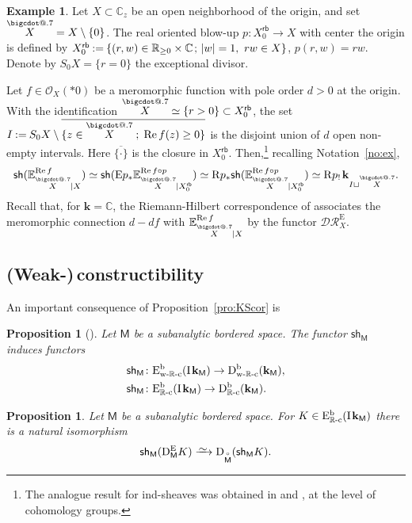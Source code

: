 \documentclass[11pt]{article}
\makeatletter
\numberwithin{equation}{section}
\let\mathcal\mathscr
\newcommand{\isom}{\xrightarrow{{\raisebox{-.6ex}[0ex][0ex]{$\mspace{1mu}\textstyle\sim\mspace{2mu}$}}}}
\newcommand{\accentset}[2]{\overset{#1}{#2}}
\let\ol\overline
\newcommand*\bigcdot{\mathpalette\bigcdot@{.7}}
\newcommand*\bigcdot@[2]{\mathbin{\vcenter{\hbox{\scalebox{#2}{$\m@th#1\bullet$}}}}}
\newcommand{\bdot}[1]{{\accentset{\bigcdot}{#1}}\vphantom{#1}}
\newcommand{\semicolon}{\nobreak \mskip2mu\mathpunct{}\nonscript\mkern-\thinmuskip{;}\mskip6mu plus1mu\relax}
\theoremstyle{plain}
\newtheorem{proposition}[theorem]{Proposition}
\theoremstyle{definition}
\newtheorem{example}[theorem]{Example}
\newcommand{\C}{\mathbb{C}}
\newcommand{\R}{\mathbb{R}}
\renewcommand{\Re}{\operatorname{Re}}
\newcommand{\derived}[1]{\mathrm{#1}}
\newcommand{\derd}{\derived{D}}
\newcommand{\dere}{\derived{E}}\let\enh\dere
\newcommand{\derr}{\derived{R}}
\newcommand{\BDC}{\derd^{\mathrm{b}}}
\newcommand{\BECRc}[2][\ifield]{\dere^{\mathrm{b}}_\Rc(#1_{#2})}
\newcommand{\BECwRc}[2][\ifield]{\dere^{\mathrm{b}}_\wRc(#1_{#2})}
\newcommand{\roim}[1]{\derr#1_*}
\newcommand{\reim}[1]{\derr#1_{\mspace{.5mu}!}\mspace{2mu}}
\newcommand{\drE}[1][X]{\mathcal{DR}^\enh_{#1}}
\newcommand{\sheaffont}[1]{\mathcal{#1}}
\renewcommand{\O}{\sheaffont{O}}
\newcommand{\Edual}{\dual^\enh}
\newcommand{\Eoim}[1]{\enh#1_*}
\newcommand{\dual}{\mathrm{D}}
\newcommand{\Rc}{{\R\text-\mathrm{c}}}
\newcommand{\wRc}{{\mathrm{w}\text-\R\text-\mathrm{c}}}
\newcommand{\field}{\mathbf{k}}\let\cor\field
\newcommand{\ind}{\mathrm{I}\mspace{2mu}}
\newcommand{\ifield}{\ind\field}
\newcommand{\unbordered}[1]{{\accentset{\circ}{#1}}}
\newcommand{\rb}{\mathsf{rb}}
\newcommand{\sh}{\mathsf{sh}}
\newcommand{\bbM}{\mathsf{M}}
\newcommand{\obM}{\unbordered{\bbM}}
\newcommand{\Ex}{\mathbb{E}}
\newcommand{\RB}[2][N]{#2_{#1}^{\rb}}
\newcommand{\defeq}{\mathbin{:=}}\let \seteq\defeq
\newcommand{\st}[1]{{\{{#1}\}}}
\makeatother
\begin{document}
\begin{example}
Let $X\subset \C_z$ be an open neighborhood of the origin, and set $\bdot X=X\setminus\st0$.
The real oriented blow-up $p\colon \RB[0]X \to X$ with center the origin is
defined by $\RB[0]X \defeq\st{(r,w)\in\R_{\ge0}\times\C\semicolon |w|=1,\ rw\in X}$,
$p(r,w)=r w$. Denote by $S_0X=\st{r=0}$ the exceptional divisor.

Let $f\in\O_X(*0)$ be a meromorphic function with pole order $d>0$
at the origin.
With the identification $\bdot X\simeq\st{r>0}\subset\RB[0]X$, the set
$I\seteq S_0X\setminus\ol{\st{z\in\bdot X\;;\;\Re f(z)\ge0}}$
is the disjoint union of $d$ open non-empty intervals.
Here
$\ol{\st{\cdot}}$ is the closure in $\RB[0]X$.
Then,\footnote{The analogue result for ind-sheaves was obtained in \cite[Prop.\,7.3]{KS03} and \cite[Prop.\,3.14]{IT20}, at the level of cohomology groups.} recalling Notation~\ref{no:ex},
\[
\sh(\Ex_{\bdot X|X}^{\Re f}) \simeq
\sh (\Eoim p \Ex_{\bdot X|\RB[0]X}^{\Re f\circ p})
\simeq \roim p\sh ( \Ex_{\bdot X|\RB[0]X}^{\Re f\circ p})\simeq
\reim p \field_{I\sqcup\bdot X}.
\]
Recall that, for $\field=\C$, the Riemann-Hilbert correspondence of \cite{DK16} associates the meromorphic connection $d-df$ with $\Ex_{\bdot X|X}^{\Re f}$ by the functor $\drE$.
\end{example}

\subsection{(Weak-)\,constructibility}

An important consequence of Proposition~\ref{pro:KScor} is

\begin{proposition}[{\cite[Th.\,6.6.4]{KS16}}]
Let $\bbM$ be a subanalytic bordered space.
The functor $\sh_\bbM$ induces functors
\begin{align*}
\sh_\bbM&\colon\BECwRc \bbM \to \BDC_\wRc(\field_\bbM), \\
\sh_\bbM&\colon\BECRc \bbM \to \BDC_\Rc(\field_\bbM).
\end{align*}
\end{proposition}

\begin{proposition}
Let $\bbM$ be a subanalytic bordered space.
For $K\in\BECRc \bbM$ there is a natural isomorphism
\[
\sh_\bbM( \Edual_\bbM K) \isom \dual_\obM( \sh_\bbM K).
\]
\end{proposition}
\end{document}

